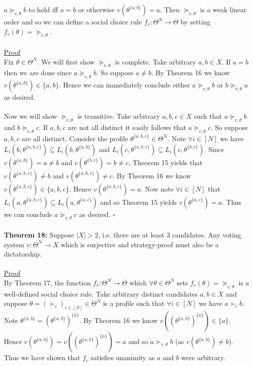 \documentclass[11pt]{article}
\theoremstyle{definition}
\theoremstyle{plain}
\begin{document}
$a\succeq_{v,\theta} b$ to hold iff $a = b$ or otherwise $v(\theta^{\{a,b\}})=a$.
Then $\succeq_{v,\theta}$ is a weak linear order and so we can define a social
choice rule $f_v: \Theta^N \to \overline{\Theta}$ by setting
$f_v(\theta)=\succeq_{v,\theta}$.
\\
\\
\underline{Proof}
\\
Fix $\theta \in \Theta^N$. We will first show $\succeq_{v,\theta}$ is complete. Take arbitrary $a,b \in X$. If $a=b$ then we are done since $a \succeq_{v,\theta} b$. So suppose $a \neq b$. By Theorem 16 we know $v(\theta^{\{a,b\}})\in \{a,b\}$. Hence we can immediately conclude  either $a \succeq_{v,\theta} b$ or $b \succeq_{v,\theta} a$ as desired.
\\
\\
Now we will show $\succeq_{v,\theta}$ is transitive. Take arbitrary $a,b,c \in X$ such that $a \succeq_{v,\theta} b$ and $b \succeq_{v,\theta} c$. If $a,b,c$ are not all distinct it easily follows that $a \succeq_{v,\theta} c$. So suppose $a,b,c$ are all distinct. Consider the profile $\theta^{\{a,b,c\}} \in \Theta^N$. Note $\forall i \in [N]$ we have $L_i(b,\theta^{\{a,b,c\}}) \subseteq L_i(b,\theta^{\{a,b\}})$ and $L_i(c,\theta^{\{a,b,c\}}) \subseteq L_i(c,\theta^{\{b,c\}})$. Since $v(\theta^{\{a,b\}}) =a\neq b$ and $v(\theta^{\{b,c\}}) =b\neq c$, Theorem 15 yields that  $v(\theta^{\{a,b,c\}}) \neq b$ and $v(\theta^{\{a,b,c\}}) \neq c$. By Theorem 16 we know $v(\theta^{\{a,b,c\}}) \in \{a,b,c\}$. Hence $v(\theta^{\{a,b,c\}})=a$. Now note $\forall i \in [N]$ that $L_i(a,\theta^{\{a,b,c\}}) \subseteq L_i(a,\theta^{\{a,c\}})$ and so Theorem 15 yields $v(\theta^{\{a,c\}})=a$. Thus we can conclude $a \succeq_{v,\theta} c$ as desired. $\square$
\\
\\
\textbf{Theorem 18:} Suppose $|X|>2$, i.e. there are at least 3 candidates. Any
voting system $v: \Theta^N \to X$ which is surjective and strategy-proof must also
be a dictatorship.
\\
\\
\underline{Proof}
\\
By Theorem 17, the function $f_v: \Theta^N \to \overline{\Theta}$ which $\forall \theta \in \Theta^N$ sets $f_v(\theta)=\succeq_{v,\theta}$ is a well-defined social choice rule. Take arbitrary distinct candidates $a,b \in X$ and suppose $\theta=(\succ_i)_{i \in [N]} \in \Theta^N$ is a profile such that $\forall i \in [N]$ we have $a \succ_i b$. Note $\theta^{\{a,b\}}=(\theta^{\{a,b\}})^{\{a\}}$. By Theorem 16 we know $v((\theta^{\{a,b\}})^{\{a\}}) \in \{a\}$. Hence $v(\theta^{\{a,b\}})=v((\theta^{\{a,b\}})^{\{a\}})=a$ and so $a \succ_{v,\theta} b$ (as $v(\theta^{\{a,b\}})\neq b$). Thus we have shown that $f_v$ satisfies unanimity as $a$ and $b$ were arbitrary. 
\end{document}
